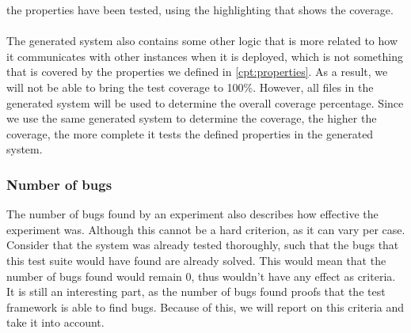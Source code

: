the properties have been tested, using the highlighting that shows the
coverage.\\
\\
The generated system also contains some other logic that is more related to how
it communicates with other instances when it is deployed, which is not something
that is covered by the properties we defined in \autoref{cpt:properties}. As a
result, we will not be able to bring the test coverage to 100\%. However, all
files in the generated system will be used to determine the overall coverage
percentage. Since we use the same generated system to determine the coverage,
the higher the coverage, the more complete it tests the defined properties in
the generated system.

\subsubsection{Number of bugs}
The number of bugs found by an experiment also describes how effective the
experiment was. Although this cannot be a hard criterion, as it can vary per
case. Consider that the system was already tested thoroughly, such that the bugs
that this test suite would have found are already solved. This would mean that
the number of bugs found would remain 0, thus wouldn't have any effect as
criteria. It is still an interesting part, as the number of bugs found proofs
that the test framework is able to find bugs. Because of this, we will report on
this criteria and take it into account.



